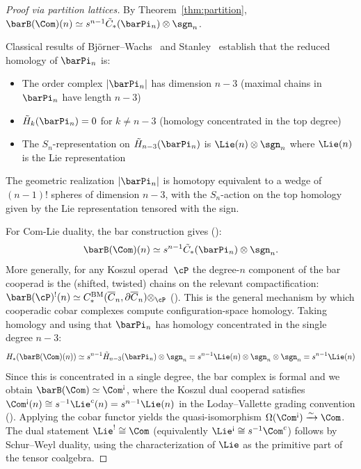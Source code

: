 \begin{proof}[Proof via partition lattices]
By Theorem~\ref{thm:partition}, $\barB(\Com)(n) \simeq s^{n-1}\tilde{C}_{*}(\barPi_n) \otimes \sgn_n$.

Classical results of Björner--Wachs~\cite{BW83} and Stanley~\cite{Sta97} establish that the reduced homology of $\barPi_n$ is:
\begin{itemize}
\item The order complex $|\barPi_n|$ has dimension $n-3$ (maximal chains in $\barPi_n$ have length $n-3$)
\item $\tilde{H}_k(\barPi_n) = 0$ for $k \neq n-3$ (homology concentrated in the top degree)
\item The $S_n$-representation on $\tilde{H}_{n-3}(\barPi_n)$ is $\Lie(n) \otimes \sgn_n$ where $\Lie(n)$ is the Lie representation
\end{itemize}

The geometric realization $|\barPi_n|$ is homotopy equivalent to a wedge of $(n-1)!$ spheres of dimension $n-3$, with the $S_n$-action on the top homology given by the Lie representation tensored with the sign.

For Com-Lie duality, the bar construction gives
(\cite[Theorem~7.2.1]{LV12}):
\[\barB(\Com)(n) \simeq s^{n-1}\tilde{C}_{*}(\barPi_n) \otimes \sgn_n.\]
More generally, for any Koszul operad~$\cP$ the degree-$n$
component of the bar cooperad is the (shifted, twisted)
chains on the relevant compactification:
$\barB(\cP)^{!}(n) \simeq
C_*^{\mathrm{BM}}(\overline{C}_n, \partial\overline{C}_n)
\otimes_{\cP}$
(\cite[\S7.1]{LV12}). This is the general mechanism
by which cooperadic cobar complexes compute
configuration-space homology.
Taking homology and using that
$\barPi_n$ has homology concentrated in the single
degree $n-3$:
\[H_*(\barB(\Com)(n)) \simeq s^{n-1}\tilde{H}_{n-3}(\barPi_n) \otimes \sgn_n = s^{n-1}\Lie(n) \otimes \sgn_n \otimes \sgn_n = s^{n-1}\Lie(n)\]
Since this is concentrated in a single degree, the bar complex is
formal and we obtain
$\barB(\Com) \simeq \Com^{\text{\textexclamdown}}$, where the
Koszul dual cooperad satisfies
$\Com^{\text{\textexclamdown}}(n) \cong s^{-1}\Lie^c(n) =
s^{n-1}\Lie(n)$ in the Loday--Vallette grading convention
(\cite[\S7.2, \S13.1.4]{LV12}). Applying the cobar functor
yields the quasi-isomorphism
$\Omega(\Com^{\text{\textexclamdown}}) \xrightarrow{\sim} \Com$.
The dual statement $\Lie^! \cong \Com$ (equivalently
$\Lie^{\text{\textexclamdown}} \cong s^{-1}\Com^c$) follows by
Schur--Weyl duality, using the characterization of $\Lie$ as the
primitive part of the tensor coalgebra.
\end{proof}

